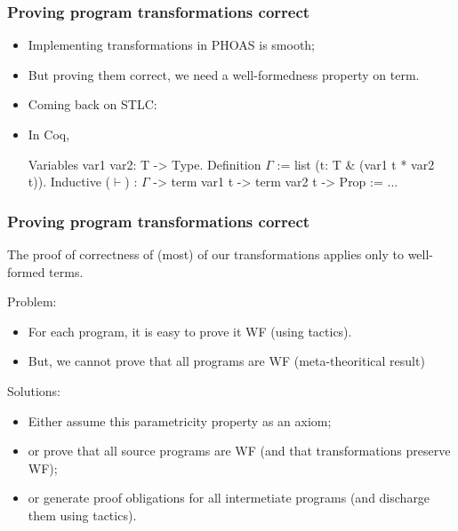 \documentclass[9pt]{beamer}
\begin{document}
\begin{frame}[fragile]
  \frametitle{Proving program transformations correct}

\newcommand\lvar[1]{{\tt Var~#1}}
\newcommand\labs[1]{{\tt Abs~#1}}
\newcommand\lapp[2]{{\tt App~#1~#2}}

  \begin{itemize}
  \item Implementing transformations in PHOAS is smooth;
  \item But proving them correct, we need a well-formedness property
    on term.

  \item Coming back on STLC:


  \item In Coq,  
\begin{coq}
Variables var1 var2: T -> Type.
Definition $\Gamma$ := list ({t: T & (var1 t * var2 t)}). 
Inductive ($\vdash$) : $\Gamma$ -> term var1 t -> term var2 t -> Prop := ...
\end{coq}
  \end{itemize}
\end{frame}

\begin{frame}
  \frametitle{Proving program transformations correct}
  The proof of correctness of (most) of our transformations  applies only to well-formed terms.

  Problem:
  \begin{itemize}
  \item For each program, it is easy to prove it WF (using tactics).
  \item But, we cannot prove that all programs are WF (meta-theoritical result)
  \end{itemize}

  Solutions:
  \begin{itemize}
  \item Either assume this parametricity property as an axiom;
  \item or prove that all source programs are WF (and that transformations preserve WF);
  \item or generate proof obligations for all intermetiate programs (and discharge them using tactics).
  \end{itemize}

\end{frame}

\end{document}
